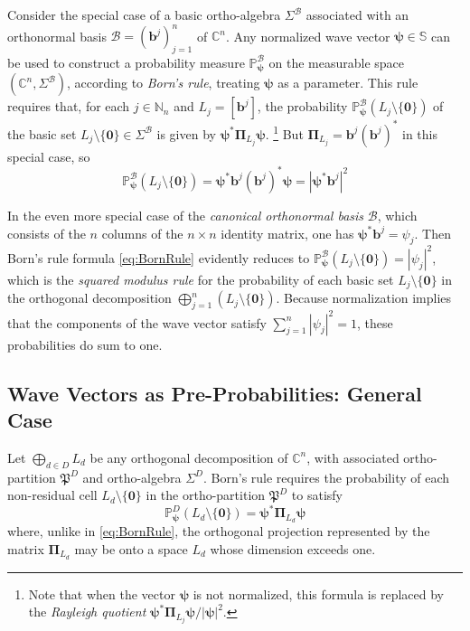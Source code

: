 \documentclass[11pt]{article}
\newcommand \N { \mathbb{N} }
\newcommand \C { \mathbb{C} }
\newcommand \Sph { \mathbb{S} }
\begin{document}
Consider the special case of a basic ortho-algebra $ \Sigma ^{ \mathcal B} $
associated with an orthonormal basis $ \mathcal B = ( \mathbf b^j )_{j = 1}^n $ of $ \C^n $.
Any normalized wave vector $ \boldsymbol \psi \in \Sph $ can be used 
to construct a probability measure $ \mathbb P ^{ \mathcal B}_{ \boldsymbol \psi }$ 
on the measurable space $( \C^n, \Sigma ^{ \mathcal B} )$,
according to \emph{Born's rule}, treating $ \boldsymbol \psi $ as a parameter.
This rule requires that, for each $j \in \N_n $ and $ L_j = [ \mathbf b^j ]$,
the probability 
 \( \mathbb P^{ \mathcal B}_{ \boldsymbol \psi } ( L_j \setminus \{ \mathbf 0 \} ) \)
of the basic set $ L_j \setminus \{ \mathbf 0 \} \in \Sigma ^{ \mathcal B} $
is given by \( \boldsymbol \psi ^* \boldsymbol \Pi _{ L_j } \boldsymbol \psi \).%
\footnote{Note that when the vector $ \boldsymbol \psi $ is not normalized,
this formula is replaced by the \emph{Rayleigh quotient} 
 \( \boldsymbol \psi ^* \boldsymbol \Pi _{ L_j } \boldsymbol \psi 
 / | \boldsymbol \psi |^2 \).}
%
But $ \boldsymbol \Pi _{ L_j } = \mathbf b^j ( \mathbf b^j )^* $ in this special case, so
\begin{equation} \label{eq:BornRule}
	\mathbb P^{ \mathcal B}_{ \boldsymbol \psi } ( L_j \setminus \{ \mathbf 0 \} )
	= \boldsymbol \psi ^* \mathbf b^j ( \mathbf b^j )^* \boldsymbol \psi
	= | \boldsymbol \psi ^* \mathbf b^j |^2
\end{equation}

In the even more special case of the \emph{canonical orthonormal basis} $ \mathcal B$,
which consists of the $n$ columns of the $n \times n$ identity matrix, 
one has $ \boldsymbol \psi ^* \mathbf b^j = \psi _j $.
Then Born's rule formula \eqref{eq:BornRule} evidently reduces to 
 \( \mathbb P ^{ \mathcal B}_{ \boldsymbol \psi } ( L_j \setminus \{ \mathbf 0 \} ) 
 = | \psi _j |^2 \),
which is the \emph{squared modulus rule} for the probability
of each basic set $ L_j \setminus \{ \mathbf 0 \}$ 
in the orthogonal decomposition $ \bigoplus _{j = 1}^n ( L_j \setminus \{ \mathbf 0 \} )$.
Because normalization implies that the components of the wave vector
satisfy $ \sum _{j = 1}^n | \psi _j |^2 = 1$, these probabilities do sum to one. 

\subsection{Wave Vectors as Pre-Probabilities: General Case}

Let $ \bigoplus _{d \in D} L_d $ be any orthogonal decomposition of $ \C^n $,
with associated ortho-partition $ \mathfrak P^D $ and ortho-algebra $ \Sigma ^D $.
Born's rule requires the probability 
of each non-residual cell $ L_d \setminus \{ \mathbf 0 \} $ 
in the ortho-partition $ \mathfrak P^D $ to satisfy
\begin{equation} \label{eq:Born}
	 \mathbb P^D_{ \boldsymbol \psi } ( L_d \setminus \{ \mathbf 0 \} )
	 = \boldsymbol \psi ^* \boldsymbol \Pi _{ L_d } \boldsymbol \psi
\end{equation}
where, unlike in \eqref{eq:BornRule}, 
the orthogonal projection represented by the matrix $ \boldsymbol \Pi _{ L_d }$
may be onto a space $ L_d $ whose dimension exceeds one.
\end{document}
